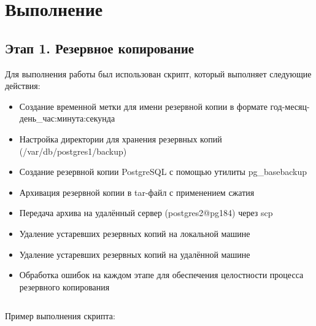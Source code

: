 \section{Выполнение}

\subsection{Этап 1. Резервное копирование}

Для выполнения работы был использован скрипт, который выполняет следующие действия:

\begin{itemize}
    \item Создание временной метки для имени резервной копии в формате год-месяц-день\_час:минута:секунда
    \item Настройка директории для хранения резервных копий (/var/db/postgres1/backup)
    \item Создание резервной копии PostgreSQL с помощью утилиты pg\_basebackup
    \item Архивация резервной копии в tar-файл с применением сжатия
    \item Передача архива на удалённый сервер (postgres2@pg184) через scp
    \item Удаление устаревших резервных копий на локальной машине
    \item Удаление устаревших резервных копий на удалённой машине
    \item Обработка ошибок на каждом этапе для обеспечения целостности процесса резервного копирования
\end{itemize}

\inputminted[breaklines,linenos,frame=single]{bash}{backup.sh}

Пример выполнения скрипта:

